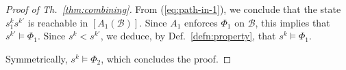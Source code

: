 \documentclass{llncs}
\newcommand{\Simon}{\\\hfill\mdash Simon}
\newcommand{\noteSB}[2][color=green!40, size=\tiny]{\todo[#1]{{#2}\Simon}}
\newcommand{\defn}[1]{Def.~\ref{defn:#1}}
\newcommand{\eq}[1]{(\ref{eq:#1})}
\newcommand{\thm}[1]{Th.~\ref{thm:#1}}
\newcommand{\cB}{\ensuremath{\mathcal{B}}}
\newcommand{\mdash}[1][]{---#1}
\newcommand{\order}{<}
\newcommand{\semopen}[1]{\ensuremath{[{#1}]}}
\begin{document}
\begin{proof}[Proof of \thm{combining}]
  From \eq{path-in-1}, we conclude that the state $s^k_1
  s^{k\prime}$ is reachable in $\semopen{A_1(\cB)}$.  Since $A_1$
  enforces $\Phi_1$ on $\cB$, this implies that $s^{k\prime}
  \models \Phi_1$.  Since $s^k \order s^{k\prime}$, we deduce, by
  \defn{property}, that $s^k \models \Phi_1$.

  Symmetrically, $s^k \models \Phi_2$, which concludes
  the proof.
\end{proof}

%
%
%
\end{document}
